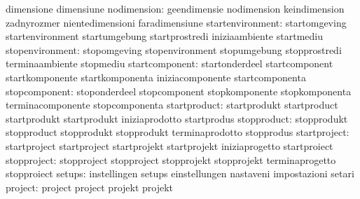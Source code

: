                                   dimensione                       dimensiune
                     nodimension: geendimensie                     nodimension
                                  keindimension                    zadnyrozmer
                                  nientedimensioni                 faradimensiune
                startenvironment: startomgeving                    startenvironment
                                  startumgebung                    startprostredi
                                  iniziaambiente                   startmediu
                 stopenvironment: stopomgeving                     stopenvironment
                                  stopumgebung                     stopprostredi
                                  terminaambiente                  stopmediu
                  startcomponent: startonderdeel                   startcomponent
                                  startkomponente                  startkomponenta
                                  iniziacomponente                 startcomponenta
                   stopcomponent: stoponderdeel                    stopcomponent
                                  stopkomponente                   stopkomponenta
                                  terminacomponente                stopcomponenta
                    startproduct: startprodukt                     startproduct
                                  startprodukt                     startprodukt
                                  iniziaprodotto                   startprodus
                     stopproduct: stopprodukt                      stopproduct
                                  stopprodukt                      stopprodukt
                                  terminaprodotto                  stopprodus
                    startproject: startproject                     startproject
                                  startprojekt                     startprojekt
                                  iniziaprogetto                   startproiect
                     stopproject: stopproject                      stopproject
                                  stopprojekt                      stopprojekt
                                  terminaprogetto                  stopproiect
                          setups: instellingen                     setups
                                  einstellungen                    nastaveni
                                  impostazioni                     setari
                         project: project                          project
                                  projekt                          projekt
